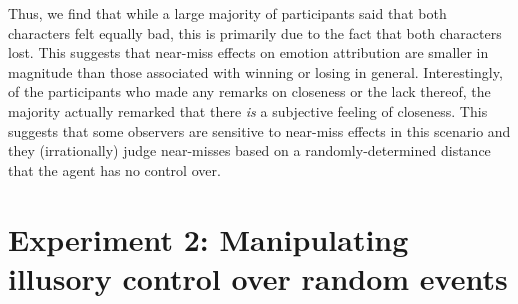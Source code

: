 \documentclass[10pt,letterpaper]{article}
\newcommand{\red}[1]{\textcolor{Red}{#1}}
\begin{document}
	Thus, we find that while a large majority of participants said that both characters felt equally bad, this is primarily due to the fact that both characters lost. This suggests that near-miss effects on emotion attribution are smaller in magnitude than those associated with winning or losing in general. Interestingly, of the participants who made any remarks on closeness or the lack thereof, the majority actually remarked that there \textit{is} a subjective feeling of closeness. This suggests that some observers are sensitive to near-miss effects in this scenario and they (irrationally) judge near-misses based on a randomly-determined distance that the agent has no control over.









\section{Experiment 2: Manipulating illusory control over random events}


\end{document}
